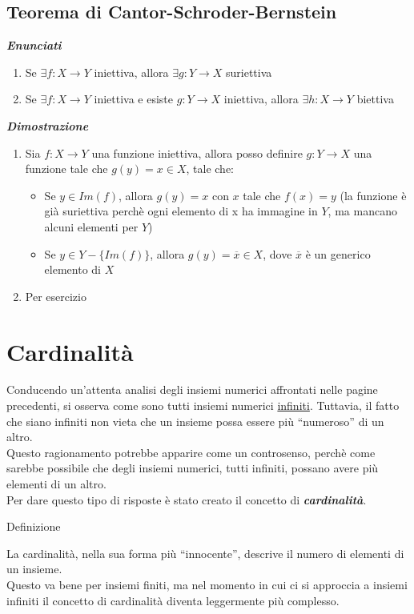 \documentclass{article}
\theoremstyle{definition}
\newcommand{\virgolette}[1]{``#1''}
\begin{document}
\subsection{Teorema di Cantor-Schroder-Bernstein}
\begin{center}
    \textbf{\textit{Enunciati}}
\end{center}
\begin{enumerate}
    \item Se $\exists f: X \rightarrow Y$ iniettiva, allora $\exists g: Y \rightarrow X$ suriettiva
    \item Se $\exists f: X \rightarrow Y$ iniettiva e esiste $g: Y \rightarrow X$ iniettiva, allora $\exists h: X \rightarrow Y$ biettiva
\end{enumerate}
\begin{center}
    \textbf{\textit{Dimostrazione}}
\end{center}
\begin{enumerate}
    \item Sia $f: X \to Y$ una funzione iniettiva, allora posso definire $g:Y \to X$ una funzione tale che $g(y)=x \in X$, tale che:
    \begin{itemize}
        \item Se $y \in Im(f)$, allora $g(y)=x$ con $x$ tale che $f(x)=y$ (la funzione è già suriettiva perchè ogni elemento di x ha immagine in $Y$, ma mancano alcuni elementi per $Y$)
        \item Se $y \in Y -\{Im(f)\}$, allora $g(y) = \overline{x} \in X$, dove $\overline{x}$ è un generico elemento di $X$
    \end{itemize}
    \item Per esercizio
\end{enumerate}




\newpage

\section{Cardinalità}
Conducendo un'attenta analisi degli insiemi numerici affrontati nelle pagine precedenti, si osserva come sono tutti insiemi numerici \underline{infiniti}. Tuttavia, il fatto che siano infiniti non vieta che un insieme possa essere più \virgolette{numeroso} di un altro.
\\ Questo ragionamento potrebbe apparire come un controsenso, perchè come sarebbe possibile che degli insiemi numerici, tutti infiniti, possano avere più elementi di un altro.
\\ Per dare questo tipo di risposte è stato creato il concetto di \textbf{\textit{cardinalità}}.
\begin{center}
    Definizione
\end{center}
La cardinalità, nella sua forma più \virgolette{innocente}, descrive il numero di elementi di un insieme.
\\ Questo va bene per insiemi finiti, ma nel momento in cui ci si approccia a insiemi infiniti il concetto di cardinalità diventa leggermente più complesso.
\\
\end{document}
